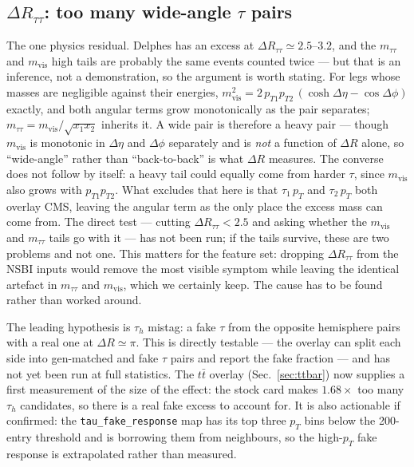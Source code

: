 \documentclass[11pt,a4paper]{article}
\newcommand{\tauh}{\tau_{h}}
\newcommand{\mtautau}{m_{\tau\tau}}
\newcommand{\mvis}{m_{\mathrm{vis}}}
\newcommand{\dR}{\Delta R}
\begin{document}
\subsection{$\dR_{\tau\tau}$: too many wide-angle $\tau$ pairs}
\label{sec:drtautau}

The one physics residual. Delphes has an excess at $\dR_{\tau\tau}\simeq2.5$--$3.2$, and
the $\mtautau$ and $\mvis$ high tails are probably the same events counted twice --- but
that is an inference, not a demonstration, so the argument is worth stating. For legs whose
masses are negligible against their energies,
$\mvis^{2}=2\,p_{T1}p_{T2}\,(\cosh\Delta\eta-\cos\Delta\phi)$ exactly, and both
angular terms grow monotonically as the pair separates; $\mtautau=\mvis/\sqrt{x_{1}x_{2}}$
inherits it. A wide pair is therefore a heavy pair --- though $\mvis$ is monotonic in
$\Delta\eta$ and $\Delta\phi$ separately and is \emph{not} a function of $\dR$ alone, so
``wide-angle'' rather than ``back-to-back'' is what $\dR$ measures. The converse does not
follow by itself: a heavy tail could equally come from harder $\tau$, since $\mvis$ also
grows with $p_{T1}p_{T2}$. What excludes that here is that $\tau_{1}\,p_{T}$ and
$\tau_{2}\,p_{T}$ both overlay CMS, leaving the angular term as the only place the excess
mass can come from. The direct test --- cutting $\dR_{\tau\tau}<2.5$ and asking whether the
$\mvis$ and $\mtautau$ tails go with it --- has not been run; if the tails survive, these
are two problems and not one. This matters for the feature set: dropping
$\dR_{\tau\tau}$ from the NSBI inputs would remove the most visible symptom while leaving
the identical artefact in $\mtautau$ and $\mvis$, which we certainly keep. The cause has to
be found rather than worked around.

The leading hypothesis is $\tauh$ mistag: a fake $\tau$ from the opposite hemisphere pairs
with a real one at $\dR\simeq\pi$. This is directly testable --- the overlay can split each
side into gen-matched and fake $\tau$ pairs and report the fake fraction --- and has not yet
been run at full statistics. The $t\bar t$ overlay (Sec.~\ref{sec:ttbar}) now supplies a first
measurement of the size of the effect: the stock card makes $1.68\times$ too many $\tauh$
candidates, so there is a real fake excess to account for. It is also actionable if
confirmed: the \texttt{tau\_fake\_response} map has its top three $p_{T}$ bins below the 200-entry
threshold and is borrowing them from neighbours, so the high-$p_{T}$ fake response is
extrapolated rather than measured.
\end{document}
